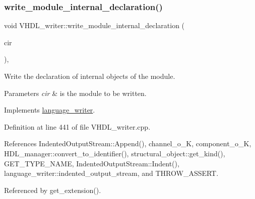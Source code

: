 \subsubsection{\texorpdfstring{write\+\_\+module\+\_\+internal\+\_\+declaration()}{write\_module\_internal\_declaration()}}
{\footnotesize\ttfamily void V\+H\+D\+L\+\_\+writer\+::write\+\_\+module\+\_\+internal\+\_\+declaration (\begin{DoxyParamCaption}\item[{const \hyperlink{structural__objects_8hpp_a8ea5f8cc50ab8f4c31e2751074ff60b2}{structural\+\_\+object\+Ref} \&}]{cir }\end{DoxyParamCaption})\hspace{0.3cm}{\ttfamily [override]}, {\ttfamily [virtual]}}



Write the declaration of internal objects of the module. 


\begin{DoxyParams}{Parameters}
{\em cir} & is the module to be written. \\
\hline
\end{DoxyParams}


Implements \hyperlink{classlanguage__writer_a3971d4b51e6c1762c29f8e0cb0a899f7}{language\+\_\+writer}.



Definition at line 441 of file V\+H\+D\+L\+\_\+writer.\+cpp.



References Indented\+Output\+Stream\+::\+Append(), channel\+\_\+o\+\_\+K, component\+\_\+o\+\_\+K, H\+D\+L\+\_\+manager\+::convert\+\_\+to\+\_\+identifier(), structural\+\_\+object\+::get\+\_\+kind(), G\+E\+T\+\_\+\+T\+Y\+P\+E\+\_\+\+N\+A\+ME, Indented\+Output\+Stream\+::\+Indent(), language\+\_\+writer\+::indented\+\_\+output\+\_\+stream, and T\+H\+R\+O\+W\+\_\+\+A\+S\+S\+E\+RT.



Referenced by get\+\_\+extension().

